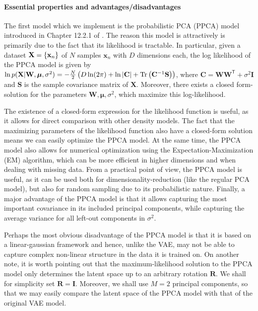 \paragraph{Essential properties and advantages/disadvantages}
The first model which we implement is the probabilistic PCA (PPCA) model introduced in Chapter 12.2.1 of \citep{bishop2006pattern}. The reason this model is attractively is primarily due to the fact that its likelihood is tractable. In particular, given a dataset $\mathbf{X} = \left \{\mathbf{x}_n\right\}$ of $N$ samples $\mathbf{x}_n$ with $D$ dimensions each, the log likelihood of the PPCA model is given by $\ln p(\mathbf{X}|\mathbf{W}, \bm{\mu}, \sigma^2) = -\frac{N}{2}\left (D \ln(2\pi) + \ln \left |\mathbf{C}\right| + \text{Tr}\left (\mathbf{C}^{-1}\mathbf{S}\right)\right)$, where $\mathbf{C} = \mathbf{W}\mathbf{W}^{\mathsf{T}} + \sigma^2 \mathbf{I}$ and $\mathbf{S}$ is the sample covariance matrix of $\mathbf{X}$. Moreover, there exists a closed form-solution for the parameters $\mathbf{W}, \bm{\mu}, \sigma^2$, which maximize this log-likelihood. 

The existence of a closed-form expression for the likelihood function is useful, as it allows for direct comparison with other density models. The fact that the maximizing parameters of the likelihood function also have a closed-form solution means we can easily optimize the PPCA model. At the same time, the PPCA model also allows for numerical optimization using the Expectation-Maximization (EM) algorithm, which can be more efficient in higher dimensions and when dealing with missing data. From a practical point of view, the PPCA model is useful, as it can be used both for dimensionality-reduction (like the regular PCA model), but also for random sampling due to its probabilistic nature. Finally, a major advantage of the PPCA model is that it allows capturing the most important covariance in its included principal components, while capturing the average variance for all left-out components in $\sigma^2$. 

Perhaps the most obvious disadvantage of the PPCA model is that it is based on a linear-gaussian framework and hence, unlike the VAE, may not be able to capture complex non-linear structure in the data it is trained on. On another note, it is worth pointing out that the maximum-likelihood solution to the PPCA model only determines the latent space up to an arbitrary rotation $\mathbf{R}$. We shall for simplicity set $\mathbf{R} = \mathbf{I}$. Moreover, we shall use $M=2$ principal components, so that we may easily compare the latent space of the PPCA model with that of the original VAE model.

